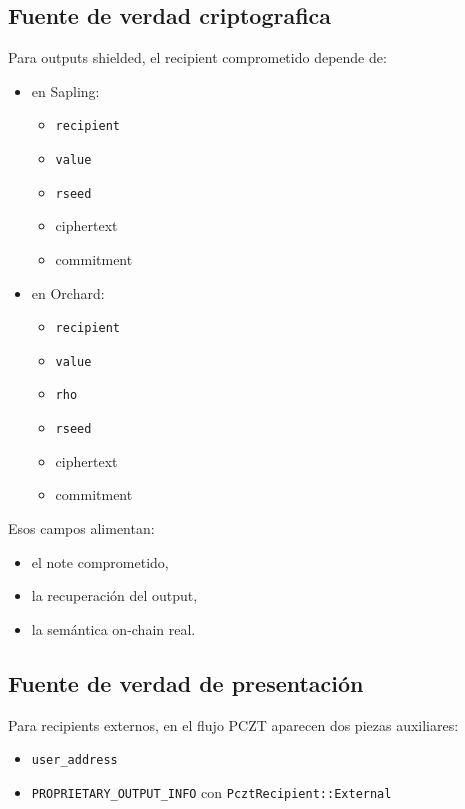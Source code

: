 \documentclass[11pt,a4paper]{article}
\begin{document}
\subsection{Fuente de verdad criptografica}

Para outputs shielded, el recipient comprometido depende de:

\begin{itemize}[leftmargin=2em]
    \item en Sapling:
    \begin{itemize}
        \item \texttt{recipient}
        \item \texttt{value}
        \item \texttt{rseed}
        \item ciphertext
        \item commitment
    \end{itemize}
    \item en Orchard:
    \begin{itemize}
        \item \texttt{recipient}
        \item \texttt{value}
        \item \texttt{rho}
        \item \texttt{rseed}
        \item ciphertext
        \item commitment
    \end{itemize}
\end{itemize}

Esos campos alimentan:

\begin{itemize}[leftmargin=2em]
    \item el note comprometido,
    \item la recuperación del output,
    \item la semántica on-chain real.
\end{itemize}

\subsection{Fuente de verdad de presentación}

Para recipients externos, en el flujo PCZT aparecen dos piezas auxiliares:

\begin{itemize}[leftmargin=2em]
    \item \texttt{user\_address}
    \item \texttt{PROPRIETARY\_OUTPUT\_INFO} con \texttt{PcztRecipient::External}
\end{itemize}
\end{document}
